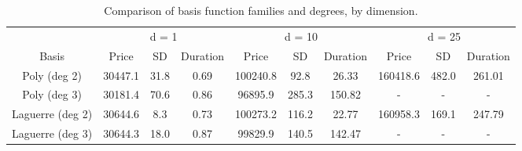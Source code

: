 \begin{table}

\caption{\label{tab:basis_functions}Comparison of basis function families and degrees, by dimension.}
\footnotesize
\setlength{\tabcolsep}{4pt}
\centering
\begin{tabular}[t]{cccccccccc}
\toprule
\multicolumn{1}{c}{ } & \multicolumn{3}{c}{d = 1} & \multicolumn{3}{c}{d = 10} & \multicolumn{3}{c}{d = 25} \\
\cmidrule(l{3pt}r{3pt}){2-4} \cmidrule(l{3pt}r{3pt}){5-7} \cmidrule(l{3pt}r{3pt}){8-10}
Basis & Price & SD & Duration & Price & SD & Duration & Price & SD & Duration\\
\midrule
Poly (deg 2) & 30447.1 & 31.8 & 0.69 & 100240.8 & 92.8 & 26.33 & 160418.6 & 482.0 & 261.01\\
Poly (deg 3) & 30181.4 & 70.6 & 0.86 & 96895.9 & 285.3 & 150.82 & - & - & -\\
Laguerre (deg 2) & 30644.6 & 8.3 & 0.73 & 100273.2 & 116.2 & 22.77 & 160958.3 & 169.1 & 247.79\\
Laguerre (deg 3) & 30644.3 & 18.0 & 0.87 & 99829.9 & 140.5 & 142.47 & - & - & -\\
\bottomrule
\end{tabular}
\end{table}
